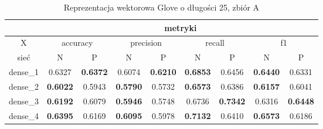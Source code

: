 \begin{table}[hp] \centering
    \caption{Reprezentacja wektorowa Glove o długości 25, zbiór A}
    \label{tab:wyniki_glove_A}
    \begin{tabular} {|c|c|c|c|c|c|c|c|c| }    \hline
                 & \multicolumn{8}{c|}{metryki}                                                                                                                                                                                                                                                                                  \\ \hline
        X        & \multicolumn{2}{c|}{accuracy}       & \multicolumn{2}{c|}{precision}      & \multicolumn{2}{c|}{recall}         & \multicolumn{2}{c|}{f1}                                                                                                                                                                     \\ \hline
        sieć     & N                                   & P                                   & N                                   & P                                   & N                                   & P                                   & N                                   & P                                   \\ \hline
        dense\_1 & 0.6327                              & \textbf{0.6372}                     & 0.6074                              & \textbf{0.6210}                     & \textbf{0.6853}                     & 0.6456                              & \textbf{0.6440}                     & 0.6331                              \\ \hline
        dense\_2 & \textbf{0.6022}                     & 0.5943                              & \textbf{0.5790}                     & 0.5732                              & \textbf{0.6573}                     & 0.6386                              & \textbf{0.6157}                     & 0.6041                              \\ \hline
        dense\_3 & \textbf{0.6192}                     & 0.6079                              & \textbf{0.5946}                     & 0.5748                              & 0.6736                              & \textbf{0.7342}                     & 0.6316                              & \textbf{0.6448}                     \\ \hline
        dense\_4 & \textbf{0.6395}                     & 0.6169                              & \textbf{0.6095}                     & 0.5978                              & \textbf{0.7132}                     & 0.6410                              & \textbf{0.6573}                     & 0.6186                              \\ \hline

\end{tabular}
\end{table}
